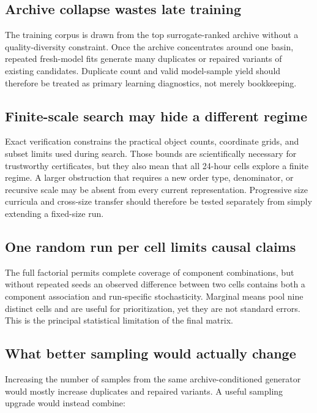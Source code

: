 \documentclass[11pt]{article}
\begin{document}
\subsection{Archive collapse wastes late training}

The training corpus is drawn from the top surrogate-ranked archive without a
quality-diversity constraint.  Once the archive concentrates around one
basin, repeated fresh-model fits generate many duplicates or repaired variants
of existing candidates.  Duplicate count and valid model-sample yield should
therefore be treated as primary learning diagnostics, not merely bookkeeping.

\subsection{Finite-scale search may hide a different regime}

Exact verification constrains the practical object counts, coordinate grids,
and subset limits used during search.  Those bounds are scientifically
necessary for trustworthy certificates, but they also mean that all 24-hour
cells explore a finite regime.  A larger obstruction that requires a new
order type, denominator, or recursive scale may be absent from every current
representation.  Progressive size curricula and cross-size transfer should
therefore be tested separately from simply extending a fixed-size run.

\subsection{One random run per cell limits causal claims}

The full factorial permits complete coverage of component combinations, but
without repeated seeds an observed difference between two cells contains
both a component association and run-specific stochasticity.  Marginal means
pool nine distinct cells and are useful for prioritization, yet they are not
standard errors.  This is the principal statistical limitation of the final
matrix.

\subsection{What better sampling would actually change}

Increasing the number of samples from the same archive-conditioned generator
would mostly increase duplicates and repaired variants.  A useful sampling
upgrade would instead combine:
\end{document}
